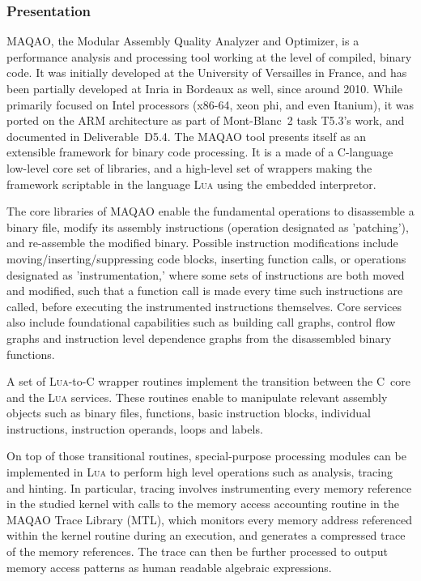 \documentclass[11pt, a4paper, twoside]{montblanc2}
\def\lua{\textsc{Lua}\xspace}
\begin{document}
\subsubsection{Presentation}
MAQAO, the Modular Assembly Quality Analyzer and Optimizer, is a performance analysis and processing 
tool working at the level of compiled, binary code. It was initially developed at the University of 
Versailles in France, and has been partially developed at Inria in Bordeaux as well, since around 
2010. While primarily focused on Intel processors (x86-64, xeon phi, and even Itanium), it was 
ported on the ARM architecture as part of Mont-Blanc~2 task T5.3's work, and documented in 
Deliverable~D5.4. The MAQAO tool presents itself as an extensible framework for binary code 
processing. It is a made of a C-language low-level core set of libraries, and a high-level set of 
wrappers making the framework scriptable in the language \lua using the embedded interpretor. 

The core libraries of MAQAO enable the fundamental operations to disassemble a binary file, modify 
its assembly instructions (operation designated as 'patching'), and re-assemble the modified binary. 
Possible instruction modifications include moving/inserting/suppressing code blocks, inserting 
function calls, or operations designated as 'instrumentation,' where some sets of instructions are 
both moved and modified, such that a function call is made every time such instructions are called, 
before executing the instrumented instructions themselves. Core services also include foundational 
capabilities such as building call graphs, control flow graphs and instruction 
level dependence graphs from the disassembled binary functions.

A set of \lua-to-C wrapper routines implement the transition between the C~core and the \lua 
services. These routines enable to manipulate relevant assembly objects such as binary files, 
functions, basic instruction blocks, individual instructions, instruction operands, loops and 
labels. 

On top of those transitional routines, special-purpose processing modules can be implemented in \lua 
to perform high level operations such as analysis, tracing and hinting. In particular, tracing 
involves instrumenting every memory reference in the studied kernel with calls to the memory access 
accounting routine in the MAQAO Trace Library (MTL), which monitors every memory address referenced 
within the kernel routine during an execution, and generates a compressed trace of the memory 
references. The trace can then be further processed to output memory access patterns as human 
readable algebraic expressions.
\end{document}
